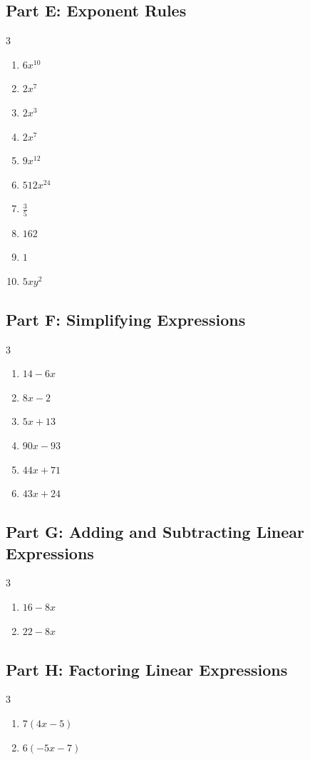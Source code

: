 \documentclass[11pt]{article}
\begin{document}
\subsection*{Part E: Exponent Rules}
\begin{multicols}{3}
\begin{enumerate}
  \item $6 x^{10}$
  \item $2 x^{7}$
  \item $2 x^{3}$
  \item $2 x^{7}$
  \item $9 x^{12}$
  \item $512 x^{24}$
  \item $\frac{3}{5}$
  \item $162$
  \item $1$
  \item $5 x y^{2}$
\end{enumerate}
\end{multicols}
\subsection*{Part F: Simplifying Expressions}
\begin{multicols}{3}
\begin{enumerate}
  \item $14 - 6 x$
  \item $8 x - 2$
  \item $5 x + 13$
  \item $90 x - 93$
  \item $44 x + 71$
  \item $43 x + 24$
\end{enumerate}
\end{multicols}
\subsection*{Part G: Adding and Subtracting Linear Expressions}
\begin{multicols}{3}
\begin{enumerate}
  \item $16 - 8 x$
  \item $22 - 8 x$
\end{enumerate}
\end{multicols}
\subsection*{Part H: Factoring Linear Expressions}
\begin{multicols}{3}
\begin{enumerate}
  \item $7(4x - 5)$
  \item $6(-5x - 7)$
\end{enumerate}
\end{multicols}
\end{document}
